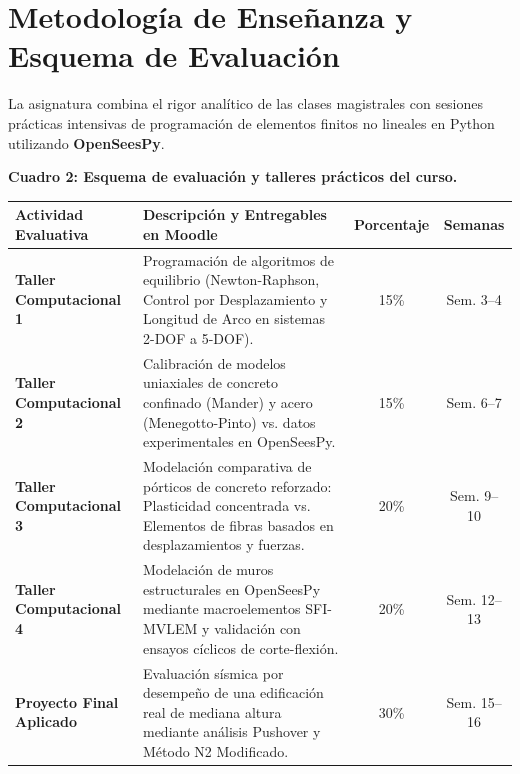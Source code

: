 \documentclass[11pt,letterpaper]{article}
\begin{document}
\section{Metodología de Enseñanza y Esquema de Evaluación}

La asignatura combina el rigor analítico de las clases magistrales con sesiones prácticas intensivas de programación de elementos finitos no lineales en Python utilizando \textbf{OpenSeesPy}.

\vspace{0.3cm}
\noindent\textbf{\color{uispurple}Cuadro 2: Esquema de evaluación y talleres prácticos del curso.}\\[4pt]
\small
\setlength{\tabcolsep}{6pt}
\renewcommand{\arraystretch}{1.25}
\begin{tabularx}{\textwidth}{l p{7.5cm} c c}
\toprule
\textbf{Actividad Evaluativa} & \textbf{Descripción y Entregables en Moodle} & \textbf{Porcentaje} & \textbf{Semanas} \\
\midrule
\textbf{Taller Computacional 1} & Programación de algoritmos de equilibrio (Newton-Raphson, Control por Desplazamiento y Longitud de Arco en sistemas 2-DOF a 5-DOF). & 15\% & Sem. 3--4 \\
\textbf{Taller Computacional 2} & Calibración de modelos uniaxiales de concreto confinado (Mander) y acero (Menegotto-Pinto) vs. datos experimentales en OpenSeesPy. & 15\% & Sem. 6--7 \\
\textbf{Taller Computacional 3} & Modelación comparativa de pórticos de concreto reforzado: Plasticidad concentrada vs. Elementos de fibras basados en desplazamientos y fuerzas. & 20\% & Sem. 9--10 \\
\textbf{Taller Computacional 4} & Modelación de muros estructurales en OpenSeesPy mediante macroelementos SFI-MVLEM y validación con ensayos cíclicos de corte-flexión. & 20\% & Sem. 12--13 \\
\textbf{Proyecto Final Aplicado} & Evaluación sísmica por desempeño de una edificación real de mediana altura mediante análisis Pushover y Método N2 Modificado. & 30\% & Sem. 15--16 \\
\bottomrule
\end{tabularx}
\vspace{0.3cm}

\end{document}
